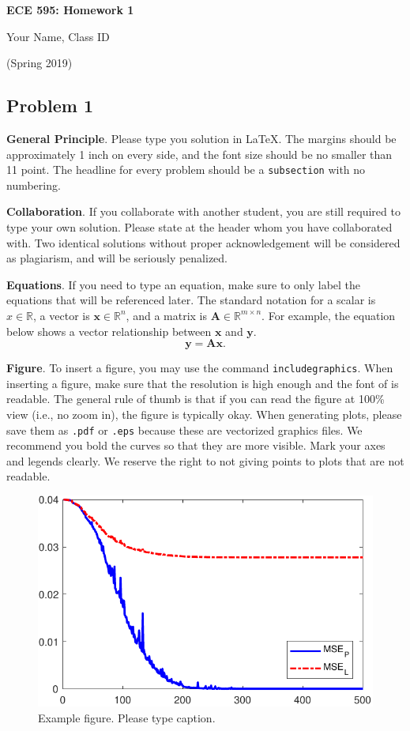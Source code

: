 \documentclass[11pt]{article}
\begin{document}
\begin{center}
\Large{\textbf{ECE 595: Homework 1}}

Your Name, Class ID

(Spring 2019)
\end{center}


\subsection*{Problem 1}
\noindent\textbf{General Principle}. Please type you solution in LaTeX. The margins should be approximately 1 inch on every side, and the font size should be no smaller than 11 point. The headline for every problem should be a \texttt{subsection} with no numbering.


\vspace{2ex}
\noindent\textbf{Collaboration}. If you collaborate with another student, you are still required to type your own solution. Please state at the header whom you have collaborated with. Two identical solutions without proper acknowledgement will be considered as plagiarism, and will be seriously penalized.




\vspace{2ex}
\noindent\textbf{Equations}. If you need to type an equation, make sure to only label the equations that will be referenced later. The standard notation for a scalar is $x \in \mathbb{R}$, a vector is $\mathbf{x} \in \mathbb{R}^n$, and a matrix is $\mathbf{A} \in \mathbb{R}^{m \times n}$. For example, the equation below shows a vector relationship between $\mathbf{x}$ and $\mathbf{y}$.
\begin{equation}
\mathbf{y} = \mathbf{A}\mathbf{x}.
\end{equation}


\vspace{2ex}
\noindent\textbf{Figure}. To insert a figure, you may use the command \texttt{includegraphics}. When inserting a figure, make sure that the resolution is high enough and the font of is readable. The general rule of thumb is that if you can read the figure at 100\% view (i.e., no zoom in), the figure is typically okay. When generating plots, please save them as \texttt{.pdf} or \texttt{.eps} because these are vectorized graphics files. We recommend you bold the curves so that they are more visible. Mark your axes and legends clearly. We reserve the right to not giving points to plots that are not readable.

\begin{figure}[h]
\centering
\includegraphics[width=0.5\linewidth]{MSE}
\caption{Example figure. Please type caption.}
\label{fig: figure 1}
\end{figure}
\end{document}
